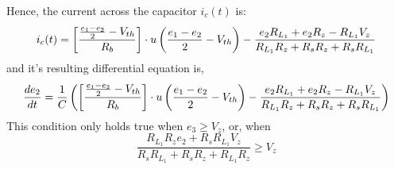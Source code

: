 Hence, the current across the capacitor $i_c(t)$ is:
\begin{equation}
	i_c(t) = \left[\frac{\frac{e_1 - e_2}{2} - V_{th}}{R_b} \right]\cdot u\left(\frac{e_1 - e_2}{2} - V_{th} \right) - \frac{e_2 R_{L_1} + e_2 R_z - R_{L_1} V_z}{R_{L_1} R_z + R_s R_z + R_s R_{L_1}}
\end{equation}
and it's resulting differential equation is,
\begin{equation}
	\frac{de_2}{dt} = \frac{1}{C}\left(\left[\frac{\frac{e_1 - e_2}{2} - V_{th}}{R_b} \right]\cdot u\left(\frac{e_1 - e_2}{2} - V_{th} \right) - \frac{e_2 R_{L_1} + e_2 R_z - R_{L_1} V_z}{R_{L_1} R_z + R_s R_z + R_s R_{L_1}} \right)
	\label{eq:resistiveLoad_DiffEq2}
\end{equation}
This condition only holds true when $e_3 \geq V_z$, or, when
\begin{equation}
	\frac{R_{L_1} R_z e_2 + R_s R_{L_1} V_z}{R_s R_{L_1} + R_s R_z + R_{L_1} R_z} \geq V_z
\end{equation}


